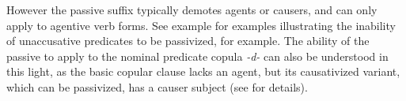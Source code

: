 However the passive suffix typically demotes agents or causers, and can only apply to agentive verb forms. See example  for examples illustrating the inability of unaccusative predicates to be passivized, for example. The ability of the passive to apply to the nominal predicate copula \textit{-d-} can also be understood in this light, as the basic copular clause lacks an agent, but its causativized variant, which can be passivized, has a causer subject (see  for details).
%




